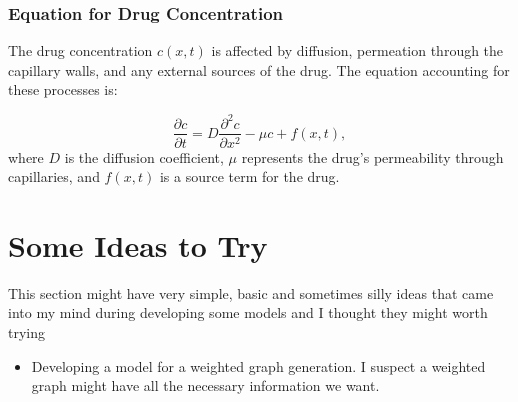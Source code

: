 \subsubsection{Equation for Drug Concentration}
The drug concentration \(c(x,t)\) is affected by diffusion, permeation through the capillary walls, and any external sources of the drug. The equation accounting for these processes is:

\begin{equation}
	\frac{\partial c}{\partial t} = D\frac{\partial^2 c}{\partial x^2} - \mu c + f(x,t),
\end{equation}
where \(D\) is the diffusion coefficient, \(\mu\) represents the drug's permeability through capillaries, and \(f(x,t)\) is a source term for the drug.




\newpage

\section{Some Ideas to Try}
This section might have very simple, basic and sometimes silly ideas that came into my mind during developing some models and I thought they might worth trying
\begin{itemize}
	\item Developing a model for a weighted graph generation. I suspect a weighted graph might have all the necessary information we want.
\end{itemize}